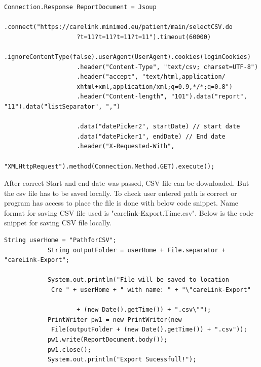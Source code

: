 \documentclass[article,type=msc,colorback,accentcolor=tud9c,twoside,11pt]{tudthesis}
\begin{document}
\begin{lstlisting}
Connection.Response ReportDocument = Jsoup
					.connect("https://carelink.minimed.eu/patient/main/selectCSV.do
					?t=11?t=11?t=11?t=11").timeout(60000)
					.ignoreContentType(false).userAgent(UserAgent).cookies(loginCookies)
					.header("Content-Type", "text/csv; charset=UTF-8")
					.header("accept", "text/html,application/
					xhtml+xml,application/xml;q=0.9,*/*;q=0.8")
					.header("Content-length", "101").data("report", "11").data("listSeparator", ",")
					
					.data("datePicker2", startDate) // start date
					.data("datePicker1", endDate) // End date
					.header("X-Requested-With",
					 "XMLHttpRequest").method(Connection.Method.GET).execute();
\end{lstlisting}
After correct Start and end date was passed, CSV file can be downloaded. But the csv file has to be saved locally. To check user entered path is correct or program has access to place the file is done with below code snippet. Name format for saving CSV file used is "carelink-Export.Time.csv". Below is the code snippet for saving CSV file locally.
\begin{lstlisting}
String userHome = "PathforCSV";
			String outputFolder = userHome + File.separator + "careLink-Export";
			
			System.out.println("File will be saved to location
			 Cre " + userHome + " with name: " + "\"careLink-Export"
			
					+ (new Date().getTime()) + ".csv\"");
			PrintWriter pw1 = new PrintWriter(new
			 File(outputFolder + (new Date().getTime()) + ".csv"));
			pw1.write(ReportDocument.body());
			pw1.close();
			System.out.println("Export Sucessfull!");
\end{lstlisting}
\begin{center}
\end{center}
\end{document}

